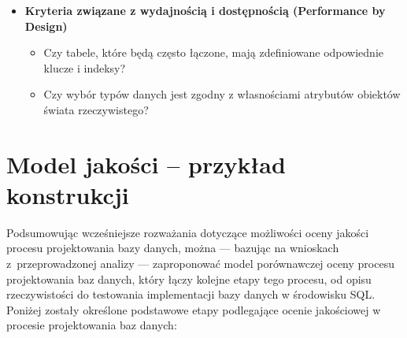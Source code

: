 \begin{itemize}
  \begin{itemize}
    \item Czy definicje i domyślne wartości pól są zgodne z biznesowymi regułami walidacji?
    \item Czy poprawność danych wymuszona jest na poziomie schematu bazy danych poprzez definicję kluczy głównych i obcych, unikalnych indeksów, typów danych, ograniczeń \texttt{CHECK}, \texttt{NOT NULL}?
    \item Czy model zawiera metadane?
    \item Czy dostępność danych zdefiniowana jest na poziomie schematu bazy danych?
    \item Czy uwzględniono mechanizmy kontroli dostępu?
    \item Czy dane wrażliwe są logicznie oddzielone?
    \item Czy określono, które tabele przechowują dane wrażliwe (kluczowe dla bezpieczeństwa i RODO)?
    \item Czy uwzględniono szyfrowanie kolumn lub tabel z danymi poufnymi?
    \item Czy możliwe jest śledzenie, skąd dane pochodzą i jak są przetwarzane (data lineage)?
    \item Czy transakcje gwarantują spójność? Czy ograniczenia integralności zapobiegają pojawianiu się „osieroconych” rekordów?
    \item Czy model danych minimalizuje redundancję poprzez odpowiedni poziom normalizacji i zapobiega powstawaniu niespójności, gdy ta sama informacja jest przechowywana w wielu miejscach?
  \end{itemize}
  \item \textbf{Kryteria związane z wydajnością i dostępnością (Performance by Design)}
  \begin{itemize}
    \item Czy tabele, które będą często łączone, mają zdefiniowane odpowiednie klucze i indeksy?
    \item Czy wybór typów danych jest zgodny z własnościami atrybutów obiektów świata rzeczywistego?
  \end{itemize}
\end{itemize}

\section{Model jakości -- przykład konstrukcji}

Podsumowując wcześniejsze rozważania dotyczące możliwości oceny jakości procesu projektowania bazy danych, można --- bazując na wnioskach z~przeprowadzonej analizy --- zaproponować model porównawczej oceny procesu projektowania baz danych, który łączy kolejne etapy tego procesu, od opisu rzeczywistości do testowania implementacji bazy danych w środowisku SQL. Poniżej zostały określone podstawowe etapy podlegające ocenie jakościowej w procesie projektowania baz danych:


